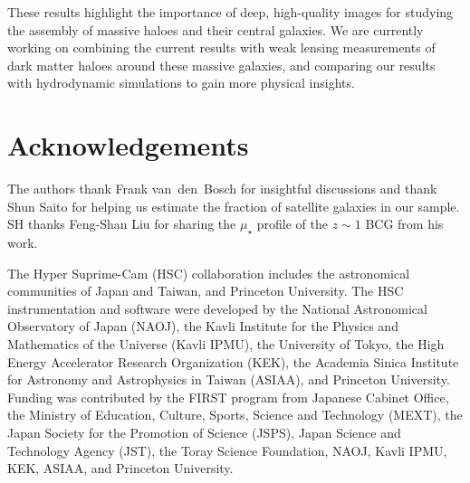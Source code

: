 \documentclass[a4paper,fleqn,usenatbib]{mnras}
\def\mden{{$\mu_{\star}$}}
\begin{document}
    These results highlight the importance of deep, high-quality images for studying 
    the assembly of massive haloes and their central galaxies. 
    We are currently working on combining the current results with weak lensing 
    measurements of dark matter haloes around these massive galaxies, and comparing 
    our results with hydrodynamic simulations to gain more physical insights. 


\section*{Acknowledgements}

  The authors thank Frank van~den~Bosch for insightful discussions and thank 
  Shun Saito for helping us estimate the fraction of satellite galaxies in our sample.
  SH thanks Feng-Shan Liu for sharing the \mden{} profile of the $z\sim1$ BCG from 
  his work.

  The Hyper Suprime-Cam (HSC) collaboration includes the astronomical communities of 
  Japan and Taiwan, and Princeton University.  The HSC instrumentation and software were
  developed by the National Astronomical Observatory of Japan (NAOJ), the Kavli Institute
  for the Physics and Mathematics of the Universe (Kavli IPMU), the University of Tokyo,
  the High Energy Accelerator Research Organization (KEK), the Academia Sinica Institute
  for Astronomy and Astrophysics in Taiwan (ASIAA), and Princeton University.  
  Funding was contributed by the FIRST program from Japanese Cabinet Office, the Ministry 
  of Education, Culture, Sports, Science and Technology (MEXT), the Japan Society for 
  the Promotion of Science (JSPS), Japan Science and Technology Agency (JST), the
  Toray Science Foundation, NAOJ, Kavli IPMU, KEK, ASIAA, and Princeton University.
   
\end{document}
